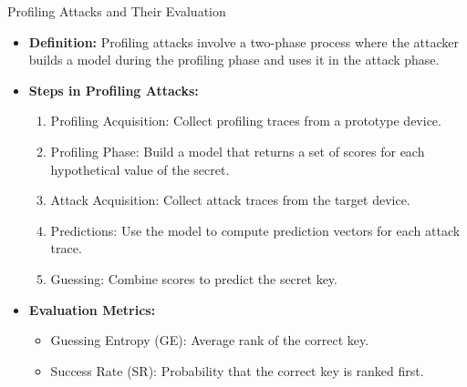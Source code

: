 \documentclass{beamer}
\begin{document}
\begin{frame}{Profiling Attacks and Their Evaluation}
    \begin{itemize}
        \item \textbf{Definition:} Profiling attacks involve a two-phase process where the attacker builds a model during the profiling phase and uses it in the attack phase.
        \item \textbf{Steps in Profiling Attacks:}
        \begin{enumerate}
            \item Profiling Acquisition: Collect profiling traces from a prototype device.
            \item Profiling Phase: Build a model that returns a set of scores for each hypothetical value of the secret.
            \item Attack Acquisition: Collect attack traces from the target device.
            \item Predictions: Use the model to compute prediction vectors for each attack trace.
            \item Guessing: Combine scores to predict the secret key.
        \end{enumerate}
        \item \textbf{Evaluation Metrics:}
        \begin{itemize}
            \item Guessing Entropy (GE): Average rank of the correct key.
            \item Success Rate (SR): Probability that the correct key is ranked first.
        \end{itemize}
    \end{itemize}
\end{frame}
\end{document}
